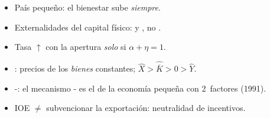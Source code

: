 \documentclass{article}
\begin{document}
\begin{columnas}
\begin{trampa}
\begin{itemize}
\item País pequeño: el bienestar sube \emph{siempre}.
\item Externalidades del capital físico:  y , no .
\item Tasa $\uparrow$ con la apertura \emph{solo} si $\alpha+\eta=1$.
\item {}: precios de los \emph{bienes} constantes; $\hat X>\hat{\overline K}>0>\hat Y$.
\item {}-: el mecanismo - es el de la economía pequeña con 2~factores (1991).
\item IOE $\neq$ subvencionar la exportación: neutralidad de incentivos.
\end{itemize}
\end{trampa}

\end{columnas}
\end{document}
